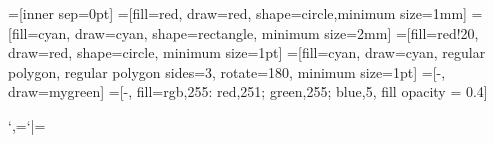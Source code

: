 =[inner sep=0pt]
=[fill=red, draw=red, shape=circle,minimum size=1mm]
=[fill=cyan, draw=cyan, shape=rectangle, minimum size=2mm]
=[fill=red!20, draw=red, shape=circle, minimum size=1pt]
=[fill=cyan, draw=cyan, regular polygon, regular polygon sides=3, rotate=180, minimum size=1pt]
=[-, draw=mygreen]
=[-, fill={rgb,255: red,251; green,255; blue,5}, fill opacity = 0.4]
\pgfplotsset{compat=1.15}
\usepackage{mathrsfs}
\usepackage{cleveref}


\newcount\cols
{\catcode`,=\active\catcode`|=\active
 \gdef\Young#1{\hbox{$\vcenter
 {\mathcode`,="8000\mathcode`|="8000
  \def,{\global\advance\cols by 1 &}%
  \def|{\cr
        \multispan{\the\cols}\hrulefill\cr
        &\global\cols=2 }%
  \offinterlineskip\everycr{}\tabskip=0pt
  \dimen0=\ht\strutbox \advance\dimen0 by \dp\strutbox
  \halign
   {\vrule height \ht\strutbox depth \dp\strutbox##
    &&\hbox to \dimen0{\hss$##$\hss}\vrule\cr
    \noalign{\hrule}&\global\cols=2 #1\crcr
    \multispan{\the\cols}\hrulefill\cr%
   }
 }$}}
\gdef\Skew(#1:#2){\hbox{$\vcenter
{\mathcode`,="8000\mathcode`|="8000
  \dimen0=\ht\strutbox \advance\dimen0 by \dp\strutbox
  \def\boxbeg{\vbox
    \bgroup\hrule\kern-0.4pt\hbox to\dimen0\bgroup\strut\vrule\hss$}%
  \def\boxend{$\hss\egroup\hrule\egroup}%
  \def,{\boxend\boxbeg}%
  \def|##1:{\boxend\vrule\egroup\nointerlineskip\kern-0.4pt
    \moveright##1\dimen0\hbox\bgroup\boxbeg}%
  \def\\##1\\##2:{\boxend\vrule\egroup\nointerlineskip\kern-0.4pt
    \kern ##1\dimen0\moveright##2\dimen0\hbox\bgroup\boxbeg}%
  \moveright#1\dimen0\hbox\bgroup\boxbeg#2\boxend\vrule\egroup
 }$}}
}
\newcommand{\halfcirc}[2]{
    \draw [fill=cyan] (#1,#2) circle (2.5pt); 
    \fill[red] (#1,#2) --++ (180:2.5pt) arc (180:0:2.5pt) -- cycle; 
}

